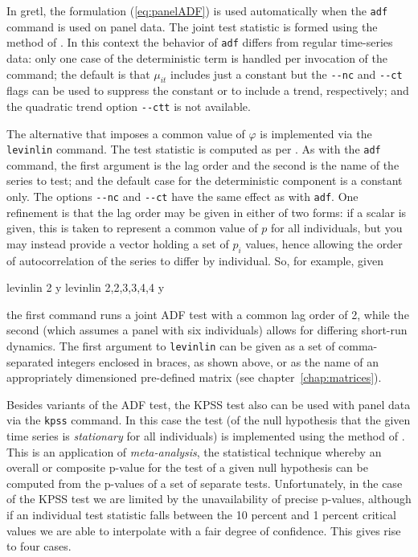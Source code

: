 In gretl, the formulation (\ref{eq:panelADF}) is used
automatically when the \texttt{adf} command is used on panel data. The
joint test statistic is formed using the method of \citet*{IPS03}. In
this context the behavior of \texttt{adf} differs from regular
time-series data: only one case of the deterministic term is handled
per invocation of the command; the default is that $\mu_{it}$ includes
just a constant but the \verb|--nc| and \verb|--ct| flags can be used
to suppress the constant or to include a trend, respectively; and the
quadratic trend option \verb|--ctt| is not available.

The alternative that imposes a common value of $\varphi$ is
implemented via the \texttt{levinlin} command. The test statistic is
computed as per \citet*{LLC2002}.  As with the \texttt{adf} command, the
first argument is the lag order and the second is the name of the
series to test; and the default case for the deterministic component
is a constant only. The options \verb|--nc| and \verb|--ct| have the
same effect as with \texttt{adf}. One refinement is that the lag order
may be given in either of two forms: if a scalar is given, this is
taken to represent a common value of $p$ for all individuals, but you
may instead provide a vector holding a set of $p_i$ values, hence
allowing the order of autocorrelation of the series to differ by
individual. So, for example, given
\begin{code}
levinlin 2 y
levinlin {2,2,3,3,4,4} y
\end{code}
the first command runs a joint ADF test with a common lag order of 2,
while the second (which assumes a panel with six individuals) allows
for differing short-run dynamics. The first argument to
\texttt{levinlin} can be given as a set of comma-separated integers
enclosed in braces, as shown above, or as the name of an appropriately
dimensioned pre-defined matrix (see chapter~\ref{chap:matrices}).

Besides variants of the ADF test, the KPSS test also can be used with
panel data via the \texttt{kpss} command. In this case the test (of
the null hypothesis that the given time series is \emph{stationary}
for all individuals) is implemented using the method of
\cite{choi01}. This is an application of \emph{meta-analysis}, the
statistical technique whereby an overall or composite p-value for the
test of a given null hypothesis can be computed from the p-values of a
set of separate tests. Unfortunately, in the case of the KPSS test we
are limited by the unavailability of precise p-values, although if an
individual test statistic falls between the 10 percent and 1 percent
critical values we are able to interpolate with a fair degree of
confidence. This gives rise to four cases.

